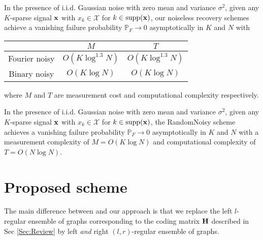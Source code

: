 \begin{theorem}\label{thm:li2} In the presence of i.i.d. Gaussian noise with zero mean and
variance $\sigma^2$, given any $K$-sparse signal $\mathbf{x}$ with $x_k \in \mathcal{X}$ for $k \in \text{supp}(\mathbf{x})$, our noiseless recovery schemes achieve a vanishing failure probability $\mathbb{P}_F \rightarrow 0$ asymptotically in $K$ and $N$ with
\begin{center}\small
\begin{tabular}{|c|c|c|}
  \hline
   & $M$ &  $T$ \\
  \hline
  Fourier noisy & $O(K \log^{1.3}N)$ & $O(K \log^{1.3}N)$ \\
  \hline
  Binary noisy & $O(K \log N)$ & $O(K \log N)$ \\
  \hline
\end{tabular}
\end{center}
where $M$ and $T$ are measurement cost and computational complexity respectively.
\end{theorem}
\vspace{2ex}

\begin{theorem}\label{thm:li3} In the presence of i.i.d. Gaussian noise with zero mean and
variance $\sigma^2$, given any $K$-sparse signal $\mathbf{x}$ with $x_k \in \mathcal{X}$ for $k \in \text{supp}(\mathbf{x})$, the RandomNoisy scheme achieves a vanishing failure probability $\mathbb{P}_F \rightarrow 0$ asymptotically in $K$ and $N$ with a measurement complexity of $M = O(K \log N)$ and computational complexity of $T = O(N \log N)$.
\end{theorem}

\section{Proposed scheme}
The main difference between \cite{li2015subdraft} and our approach is that we replace the left $l$-regular ensemble of graphs corresponding to the coding matrix $\mathbf{H}$ described in Sec \ref{Sec:Review} by left {\em and} right $\left(l, r\right)$-regular ensemble of graphs.

